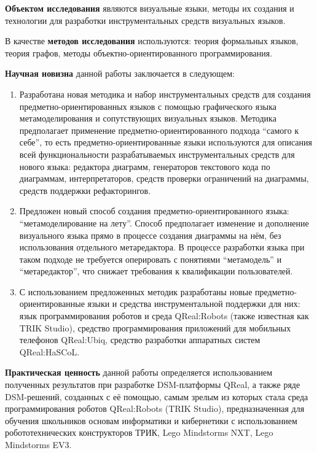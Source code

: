 \textbf{Объектом исследования} являются визуальные языки, методы их создания и технологии
для разработки инструментальных средств визуальных языков.

В качестве \textbf{методов исследования} используются: теория формальных языков, теория графов, 
методы объектно-ориентированного программирования.

\textbf{Научная новизна} данной работы заключается в следующем:
\begin{enumerate}
	\item Разработана новая методика и набор инструментальных средств для создания предметно-ориентированных 
		языков с помощью графического языка метамоделирования и сопутствующих визуальных языков.
		Методика предполагает применение предметно-ориентированного подхода "`самого к себе"', то есть
		предметно-ориентированные языки используются для описания всей функциональности разрабатываемых
		инструментальных средств для нового языка: редактора диаграмм, генераторов текстового кода по 
		диаграммам, интерпретаторов, средств проверки ограничений на диаграммы, средств поддержки рефакторингов.
	\item Предложен новый способ создания предметно-ориентированного языка: "`метамоделирование на лету"'. 
		Способ предполагает изменение и дополнение визуального языка прямо в процессе создания диаграммы на нём,
		без использования отдельного метаредактора. В процессе разработки языка при таком подходе
		не требуется оперировать с понятиями "`метамодель"' и "`метаредактор"', что снижает 
		требования к квалификации пользователей.
	\item С использованием предложенных методик разработаны новые предметно-ориентированные языки и
		средства инструментальной поддержки для них: язык программирования роботов и среда QReal:Robots
		(также известная как TRIK Studio), средство программирования приложений для мобильных телефонов 
		QReal:Ubiq, средство разработки аппаратных систем QReal:HaSCoL.
\end{enumerate}

\textbf{Практическая ценность} данной работы определяется использованием полученных 
результатов при разработке DSM-платформы QReal, а также ряде DSM-решений, созданных с её помощью, 
самым зрелым из которых стала среда программирования роботов QReal:Robots (TRIK Studio), 
предназначенная для обучения школьников основам информатики и кибернетики с использованием робототехнических 
конструкторов ТРИК, Lego Mindstorms NXT, Lego Mindstorms EV3.

